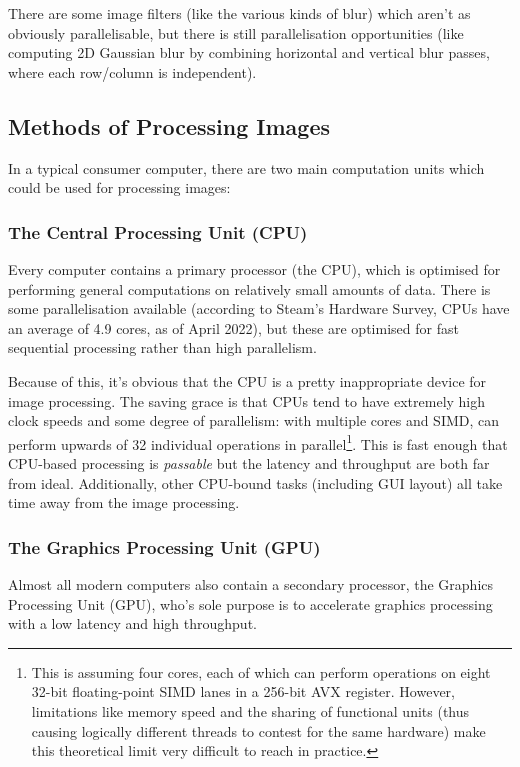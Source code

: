 \documentclass[12pt]{article}
\begin{document}
There are some image filters (like the various kinds of blur) which aren't as obviously
parallelisable, but there is still parallelisation opportunities (like computing 2D Gaussian blur by
combining horizontal and vertical blur passes, where each row/column is independent).



\subsection{Methods of Processing Images}

In a typical consumer computer, there are two main computation units which could be used for
processing images:

\subsubsection{The Central Processing Unit (CPU)}

Every computer contains a primary processor (the CPU), which is optimised for performing general
computations on relatively small amounts of data.  There is some parallelisation available
(according to Steam's Hardware Survey, CPUs have an average of 4.9 cores, as of April 2022), but
these are optimised for fast sequential processing rather than high parallelism.

Because of this, it's obvious that the CPU is a pretty inappropriate device for image processing.
The saving grace is that CPUs tend to have extremely high clock speeds and some degree of
parallelism: with multiple cores and SIMD, can perform upwards of 32 individual operations in
parallel\footnote{This is assuming four cores, each of which can perform operations on eight 32-bit
floating-point SIMD lanes in a 256-bit AVX register.  However, limitations like memory speed and the
sharing of functional units (thus causing logically different threads to contest for the same
hardware) make this theoretical limit very difficult to reach in practice.}.  This is fast enough
that CPU-based processing is \emph{passable} but the latency and throughput are both far from ideal.
Additionally, other CPU-bound tasks (including GUI layout) all take time away from the image
processing.

\subsubsection{The Graphics Processing Unit (GPU)}

Almost all modern computers also contain a secondary processor, the Graphics Processing Unit (GPU),
who's sole purpose is to accelerate graphics processing with a low latency and high throughput.
\end{document}

